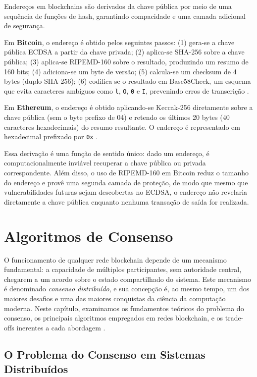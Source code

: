 \documentclass[12pt,a4paper]{report}
\begin{document}
Endereços em blockchains são derivados da chave pública por meio de uma sequência de funções de hash, garantindo compacidade e uma camada adicional de segurança.

Em \textbf{Bitcoin}, o endereço é obtido pelos seguintes passos: (1) gera-se a chave pública ECDSA a partir da chave privada; (2) aplica-se SHA-256 sobre a chave pública; (3) aplica-se RIPEMD-160 sobre o resultado, produzindo um resumo de 160 bits; (4) adiciona-se um byte de versão; (5) calcula-se um checksum de 4 bytes (duplo SHA-256); (6) codifica-se o resultado em Base58Check, um esquema que evita caracteres ambíguos como \texttt{l}, \texttt{O}, \texttt{0} e \texttt{I}, prevenindo erros de transcrição \cite{Bashir2023}.

Em \textbf{Ethereum}, o endereço é obtido aplicando-se Keccak-256 diretamente sobre a chave pública (sem o byte prefixo de 04) e retendo os últimos 20 bytes (40 caracteres hexadecimais) do resumo resultante. O endereço é representado em hexadecimal prefixado por \texttt{0x} \cite{Bashir2023}.

Essa derivação é uma função de sentido único: dado um endereço, é computacionalmente inviável recuperar a chave pública ou privada correspondente. Além disso, o uso de RIPEMD-160 em Bitcoin reduz o tamanho do endereço e provê uma segunda camada de proteção, de modo que mesmo que vulnerabilidades futuras sejam descobertas no ECDSA, o endereço não revelaria diretamente a chave pública enquanto nenhuma transação de saída for realizada.

\chapter{Algoritmos de Consenso}

O funcionamento de qualquer rede blockchain depende de um mecanismo fundamental: a capacidade de múltiplos participantes, sem autoridade central, chegarem a um acordo sobre o estado compartilhado do sistema. Este mecanismo é denominado \textit{consenso distribuído}, e sua concepção é, ao mesmo tempo, um dos maiores desafios e uma das maiores conquistas da ciência da computação moderna. Neste capítulo, examinamos os fundamentos teóricos do problema do consenso, os principais algoritmos empregados em redes blockchain, e os trade-offs inerentes a cada abordagem \cite{Bashir2023}.

\section{O Problema do Consenso em Sistemas Distribuídos}
\end{document}
